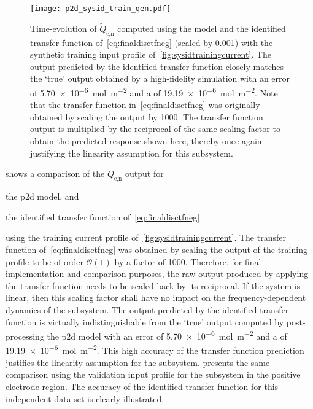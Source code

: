 \begin{figure}[!htbp]
    \centering
    \texttt{[image: p2d\_sysid\_train\_qen.pdf]}
    \caption[$\widetilde{Q}_{\text{e,n}}(t)$ outputs from  and
    identified transfer function for training profile]{%
        Time-evolution of $\widetilde{Q}_{\text{e,n}}$ computed using the
         model  and the identified transfer function
        of~\cref{eq:finaldisctfneg} (scaled by 0.001) with the synthetic
        training input profile of~\cref{fig:sysidtrainingcurrent}. The output
        predicted by the identified transfer function closely matches the `true'
        output obtained by a high-fidelity  simulation with an
         error of \SI{5.70e-6}{\mole\per\meter\squared} and a
         of \SI{19.19e-6}{\mole\per\meter\squared}. Note that the
        transfer function in~\cref{eq:finaldisctfneg} was originally obtained by
        scaling the output by 1000. The transfer function output is
        multiplied by the reciprocal of the same scaling factor to obtain the
        predicted response shown here, thereby once again justifying the
        linearity assumption for this subsystem.
    }%
    \label{fig:tfpredQentrain}
\end{figure}

 shows a comparison of the $\widetilde{Q}_{\text{e,n}}$
output for
\begin{enumerate*}[label=\emph{\alph*})]
    \item the \gls{p2d} model, and
    \item the identified transfer function of~\cref{eq:finaldisctfneg}
\end{enumerate*}
using  the  training  current  profile  of~\cref{fig:sysidtrainingcurrent}.  The
transfer function of~\cref{eq:finaldisctfneg} was obtained by scaling the output
of the  training profile to  be of order $\mathcal{O}(1)$  by a factor  of 1000.
Therefore,  for final  implementation and  comparison purposes,  the raw  output
produced  by applying  the transfer  function  needs to  be scaled  back by  its
reciprocal. If  the system  is linear,  then this scaling  factor shall  have no
impact  on  the  frequency-dependent  dynamics  of  the  subsystem.  The  output
predicted  by the  identified transfer  function is  virtually indistinguishable
from  the `true'  output computed  by post-processing  the \gls{p2d}  model with
an    error   of  \SI{5.70e-6}{\mole\per\meter\squared}  and  a
 of \SI{19.19e-6}{\mole\per\meter\squared}.  This high accuracy
of the transfer  function prediction justifies the linearity  assumption for the
subsystem.    presents  the  same  comparison  using  the
validation input profile for the subsystem in the positive electrode region. The
accuracy of  the identified transfer function  for this independent data  set is
clearly illustrated.


